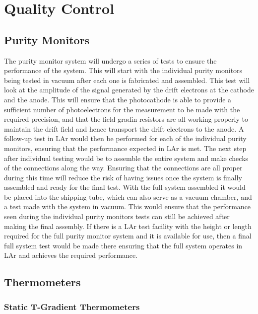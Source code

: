 \section{Quality Control}
\label{sec:fdsp-slow-cryo-qc}
\subsection{Purity Monitors}
\label{sec:fdsp-slow-cryo-qc-pm}

The purity monitor system will undergo a series of tests to ensure the performance of the system.  This will start with the individual purity monitors being tested in vacuum after each one is fabricated and assembled.  This test will look at the amplitude of the signal generated by the drift electrons at the cathode and the anode.  This will ensure that the photocathode is able to provide a sufficient number of photoelectrons for the measurement to be made with the required precision, and that the field gradin resistors are all working properly to maintain the drift field and hence transport the drift electrons to the anode.  A follow-up test in LAr would then be performed for each of the individual purity monitors, ensuring that the performance expected in LAr is met.  The next step after individual testing would be to assemble the entire system and make checks of the connections along the way.  Ensuring that the connections are all proper during this time will reduce the risk of having issues once the system is finally assembled and ready for the final test.  With the full system assembled it would be placed into the shipping tube, which can also serve as a vacuum chamber, and a test made with the system in vacuum.  This would ensure that the performance seen during the individual purity monitors tests can still be achieved after making the final assembly.  If there is a LAr test facility with the height or length required for the full purity monitor system and it is available for use, then a final full system test would be made there ensuring that the full system operates in LAr and achieves the required performance.

\subsection{Thermometers}
\label{sec:fdsp-slow-cryo-qc-th}

\subsubsection{Static T-Gradient Thermometers}
\label{sec:fdsp-slow-cryo-qc-thst}

